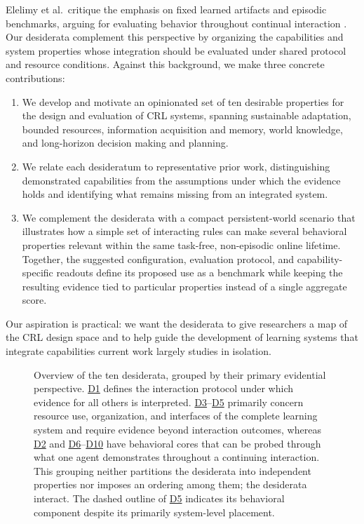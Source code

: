 \documentclass[10pt,journal,compsoc]{IEEEtran}
\DeclareRobustCommand{\Dref}[1]{\hyperref[sec:d#1]{D#1}}
\begin{document}
Elelimy et al.\ critique the emphasis on fixed learned artifacts and episodic benchmarks, arguing for evaluating behavior throughout continual interaction \cite{elelimy2025}.
Our desiderata complement this perspective by organizing the capabilities and system properties whose integration should be evaluated under shared protocol and resource conditions.
Against this background, we make three concrete contributions:
\begin{enumerate}
    \item We develop and motivate an opinionated set of ten desirable properties for the design and evaluation of CRL systems, spanning sustainable adaptation, bounded resources, information acquisition and memory, world knowledge, and long-horizon decision making and planning.
    \item We relate each desideratum to representative prior work, distinguishing demonstrated capabilities from the assumptions under which the evidence holds and identifying what remains missing from an integrated system.
    \item We complement the desiderata with a compact persistent-world scenario that illustrates how a simple set of interacting rules can make several behavioral properties relevant within the same task-free, non-episodic online lifetime.
    Together, the suggested configuration, evaluation protocol, and capability-specific readouts define its proposed use as a benchmark while keeping the resulting evidence tied to particular properties instead of a single aggregate score.
\end{enumerate}
Our aspiration is practical: we want the desiderata to give researchers a map of the CRL design space and to help guide the development of learning systems that integrate capabilities current work largely studies in isolation.

\begin{figure}
    \centering
    
    \vspace{-1.25\baselineskip}
    \caption{Overview of the ten desiderata, grouped by their primary evidential perspective.
    \Dref{1} defines the interaction protocol under which evidence for all others is interpreted.
    \Dref{3}--\Dref{5} primarily concern resource use, organization, and interfaces of the complete learning system and require evidence beyond interaction outcomes, whereas \Dref{2} and \Dref{6}--\Dref{10} have behavioral cores that can be probed through what one agent demonstrates throughout a continuing interaction.
    This grouping neither partitions the desiderata into independent properties nor imposes an ordering among them; the desiderata interact.
    The dashed outline of \Dref{5} indicates its behavioral component despite its primarily system-level placement.}
    \label{fig:overview}
\end{figure}
\end{document}

